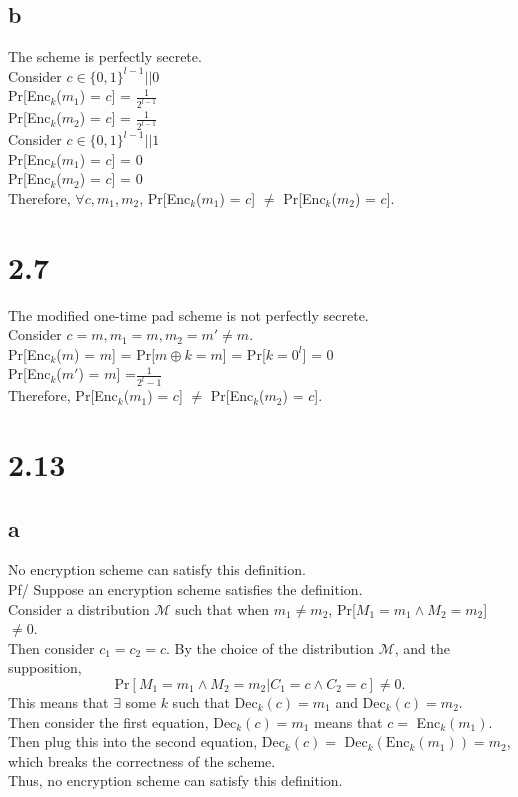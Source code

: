 \documentclass{article}
\begin{document}
\subsection*{b} The scheme is perfectly secrete. \\
Consider $c \in \{0,1\}^{l-1}||0$\\
Pr[Enc$_{k}$($m_1$) = $c$] = $ \frac{1}{2^{l-1}}$\\
Pr[Enc$_{k}$($m_2$) = $c$] = $ \frac{1}{2^{l-1}}$\\
Consider $c \in \{0,1\}^{l-1}||1$\\
Pr[Enc$_{k}$($m_1$) = $c$] = $0$\\
Pr[Enc$_{k}$($m_2$) = $c$] = $0$\\
Therefore, $\forall c, m_1,m_2$, Pr[Enc$_{k}$($m_1$) = $c$] $\neq$ Pr[Enc$_{k}$($m_2$) = $c$].





\section*{2.7} The modified one-time pad scheme is not perfectly secrete. \\
Consider $c = m, m_1 = m, m_2 = m' \neq m$.\\
Pr[Enc$_{k}$($m$) = $m$] = Pr[$m \oplus k = m$] = Pr[$k = 0^l$] = 0\\
Pr[Enc$_{k}$($m'$) = $m$] =$ \frac{1}{2^l-1}$\\
Therefore,  Pr[Enc$_{k}$($m_1$) = $c$]  $\neq$ Pr[Enc$_{k}$($m_2$) = $c$].\\

\section*{2.13}
\subsection*{a} No encryption scheme can satisfy this definition.\\
Pf/ Suppose an encryption scheme satisfies the definition.\\
Consider a distribution $\mathcal{M}$ such that when $m_1 \neq m_2$, Pr[$M_1 = m_1 \wedge M_2 = m_2$] $\neq 0$. \\
Then consider $c_1 = c_2 = c$.
By the choice of the distribution $\mathcal{M}$, and the supposition, $$
\text{Pr}[M_1 = m_1 \wedge M_2 = m_2 | C_1 = c \wedge C_2 = c] \neq 0.
$$
This means that $\exists$ some $k$ such that Dec$_{k}(c) = m_1$ and Dec$_{k}(c) = m_2$. \\
Then consider the first equation, Dec$_{k}(c) = m_1$ means that $c =$ Enc$_{k}(m_1)$. \\
Then plug this into the second equation, Dec$_{k}(c) =$ Dec$_{k}(\text{Enc}_{k}(m_1)) = m_2$, which breaks the correctness of the scheme.\\
Thus, no encryption scheme can satisfy this definition.\\
\end{document}
